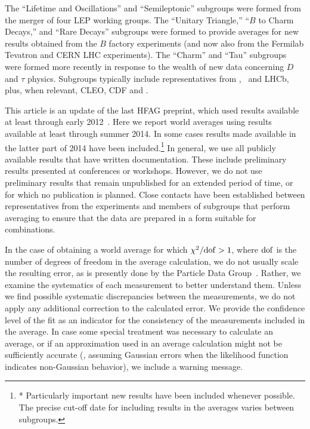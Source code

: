 The ``Lifetime and Oscillations'' and ``Semileptonic'' subgroups were formed from the merger of four LEP working groups.
The ``Unitary Triangle,'' ``$B$ to Charm Decays,'' and ``Rare Decays''
subgroups were formed to provide averages for new results obtained
from the $B$ factory experiments (and now also from the Fermilab 
Tevatron and CERN LHC experiments).
The ``Charm'' and ``Tau''  subgroups were formed more recently in 
response to the wealth of new data concerning $D$ and $\tau$ physics. 
Subgroups typically include representatives from \belle, \babar\ and LHCb, 
plus, when relevant, CLEO, CDF and \dzero. 

This article is an update of the last HFAG preprint,
which used results available at least through early 2012~\cite{Amhis:2012bh}. 
Here we report world averages using results available at least through summer 2014.
In some cases results made available in the latter part of 2014 have been
included.\footnote{*
Particularly important new results have been included whenever possible.
The precise cut-off date for including results in the averages varies 
between subgroups.}
In general, we use all publicly available results that have written documentation. 
These include preliminary results presented at conferences or workshops.
However, we do not use preliminary results that remain unpublished 
for an extended period of time, or for which no publication is planned. 
Close contacts have been established between representatives from
the experiments and members of subgroups that perform averaging 
to ensure that the data are prepared in a form suitable for 
combinations.  

In the case of obtaining a world average for which $\chi^2/{\rm dof} > 1$,
where ${\rm dof}$ is the number of degrees of freedom in the average
calculation, we do not usually scale the resulting error, as is presently 
done by the Particle Data Group~\cite{PDG_2014}.
Rather, 
we examine the systematics of each measurement to better understand them. 
Unless we find possible systematic discrepancies between the measurements, 
we do not apply any additional correction to the calculated error. 
We provide the confidence level of the fit as an indicator for the 
consistency of the measurements included in the average. In case some
special treatment was necessary to calculate an average, or if an
approximation used in an average calculation might not be 
sufficiently accurate 
(\eg, assuming Gaussian errors when the likelihood function indicates 
non-Gaussian behavior), we include a warning message.

